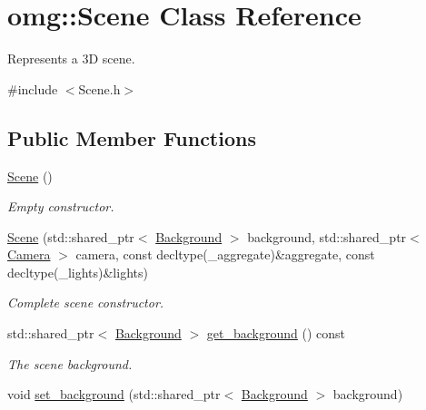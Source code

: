 \hypertarget{classomg_1_1_scene}{}\section{omg\+::Scene Class Reference}
\label{classomg_1_1_scene}


Represents a 3D scene.  




{\ttfamily \#include $<$Scene.\+h$>$}

\subsection*{Public Member Functions}
\begin{DoxyCompactItemize}
\item 
\mbox{\label{classomg_1_1_scene_af5d02c499b861b1293e0d6232dabd2c8}} 
\mbox{\hyperlink{classomg_1_1_scene_af5d02c499b861b1293e0d6232dabd2c8}{Scene}} ()
\begin{DoxyCompactList}\small\item\em Empty constructor. \end{DoxyCompactList}\item 
\mbox{\label{classomg_1_1_scene_aa96c0cb9a873edb3eefb0fd344ce524a}} 
\mbox{\hyperlink{classomg_1_1_scene_aa96c0cb9a873edb3eefb0fd344ce524a}{Scene}} (std\+::shared\+\_\+ptr$<$ \mbox{\hyperlink{classomg_1_1_background}{Background}} $>$ background, std\+::shared\+\_\+ptr$<$ \mbox{\hyperlink{classomg_1_1_camera}{Camera}} $>$ camera, const decltype(\+\_\+aggregate)\&aggregate, const decltype(\+\_\+lights)\&lights)
\begin{DoxyCompactList}\small\item\em Complete scene constructor. \end{DoxyCompactList}\item 
std\+::shared\+\_\+ptr$<$ \mbox{\hyperlink{classomg_1_1_background}{Background}} $>$ \mbox{\hyperlink{classomg_1_1_scene_a2eef3b62d9d01b19fb32751942f1fa7c}{get\+\_\+background}} () const
\begin{DoxyCompactList}\small\item\em The scene background. \end{DoxyCompactList}\item 
void \mbox{\hyperlink{classomg_1_1_scene_a66a4d47f99b8cf56d0ffeec665400d56}{set\+\_\+background}} (std\+::shared\+\_\+ptr$<$ \mbox{\hyperlink{classomg_1_1_background}{Background}} $>$ background)

\end{DoxyCompactItemize}
